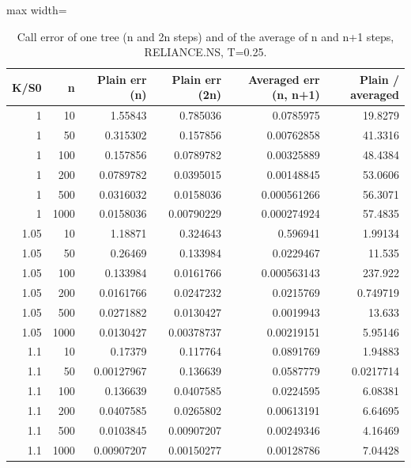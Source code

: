\begin{table}
\centering
\small
\caption{Call error of one tree (n and 2n steps) and of the average of n and n+1 steps, RELIANCE.NS, T=0.25.}
\label{tab:e9_averaging}
\begin{adjustbox}{max width=\textwidth}
\begin{tabular}{rrrrrr}
\toprule
K/S0 & n & Plain err (n) & Plain err (2n) & Averaged err (n, n+1) & Plain / averaged \\
\midrule
1 & 10 & 1.55843 & 0.785036 & 0.0785975 & 19.8279 \\
1 & 50 & 0.315302 & 0.157856 & 0.00762858 & 41.3316 \\
1 & 100 & 0.157856 & 0.0789782 & 0.00325889 & 48.4384 \\
1 & 200 & 0.0789782 & 0.0395015 & 0.00148845 & 53.0606 \\
1 & 500 & 0.0316032 & 0.0158036 & 0.000561266 & 56.3071 \\
1 & 1000 & 0.0158036 & 0.00790229 & 0.000274924 & 57.4835 \\
1.05 & 10 & 1.18871 & 0.324643 & 0.596941 & 1.99134 \\
1.05 & 50 & 0.26469 & 0.133984 & 0.0229467 & 11.535 \\
1.05 & 100 & 0.133984 & 0.0161766 & 0.000563143 & 237.922 \\
1.05 & 200 & 0.0161766 & 0.0247232 & 0.0215769 & 0.749719 \\
1.05 & 500 & 0.0271882 & 0.0130427 & 0.0019943 & 13.633 \\
1.05 & 1000 & 0.0130427 & 0.00378737 & 0.00219151 & 5.95146 \\
1.1 & 10 & 0.17379 & 0.117764 & 0.0891769 & 1.94883 \\
1.1 & 50 & 0.00127967 & 0.136639 & 0.0587779 & 0.0217714 \\
1.1 & 100 & 0.136639 & 0.0407585 & 0.0224595 & 6.08381 \\
1.1 & 200 & 0.0407585 & 0.0265802 & 0.00613191 & 6.64695 \\
1.1 & 500 & 0.0103845 & 0.00907207 & 0.00249346 & 4.16469 \\
1.1 & 1000 & 0.00907207 & 0.00150277 & 0.00128786 & 7.04428 \\
\bottomrule
\end{tabular}
\end{adjustbox}
\end{table}
